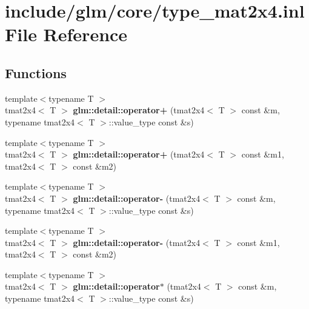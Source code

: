 \hypertarget{type__mat2x4_8inl}{\section{include/glm/core/type\-\_\-mat2x4.inl \-File \-Reference}
\label{type__mat2x4_8inl}
}
\subsection*{\-Functions}
\begin{DoxyCompactItemize}
\item 
\hypertarget{namespaceglm_1_1detail_a924aab5985fc7ae5cfe42a4b711872b9}{{\footnotesize template$<$typename T $>$ }\\tmat2x4$<$ \-T $>$ {\bfseries glm\-::detail\-::operator+} (tmat2x4$<$ \-T $>$ const \&m, typename tmat2x4$<$ \-T $>$\-::value\-\_\-type const \&s)}\label{namespaceglm_1_1detail_a924aab5985fc7ae5cfe42a4b711872b9}

\item 
\hypertarget{namespaceglm_1_1detail_a8a1cb4aca4d71974265b20a556f77f17}{{\footnotesize template$<$typename T $>$ }\\tmat2x4$<$ \-T $>$ {\bfseries glm\-::detail\-::operator+} (tmat2x4$<$ \-T $>$ const \&m1, tmat2x4$<$ \-T $>$ const \&m2)}\label{namespaceglm_1_1detail_a8a1cb4aca4d71974265b20a556f77f17}

\item 
\hypertarget{namespaceglm_1_1detail_a04309ed003f6db662629f172371fd070}{{\footnotesize template$<$typename T $>$ }\\tmat2x4$<$ \-T $>$ {\bfseries glm\-::detail\-::operator-\/} (tmat2x4$<$ \-T $>$ const \&m, typename tmat2x4$<$ \-T $>$\-::value\-\_\-type const \&s)}\label{namespaceglm_1_1detail_a04309ed003f6db662629f172371fd070}

\item 
\hypertarget{namespaceglm_1_1detail_a3421bd3205917c8daad5760334615e1e}{{\footnotesize template$<$typename T $>$ }\\tmat2x4$<$ \-T $>$ {\bfseries glm\-::detail\-::operator-\/} (tmat2x4$<$ \-T $>$ const \&m1, tmat2x4$<$ \-T $>$ const \&m2)}\label{namespaceglm_1_1detail_a3421bd3205917c8daad5760334615e1e}

\item 
\hypertarget{namespaceglm_1_1detail_a97c898dbdb3a0f9cd0089ffb42118e01}{{\footnotesize template$<$typename T $>$ }\\tmat2x4$<$ \-T $>$ {\bfseries glm\-::detail\-::operator$\ast$} (tmat2x4$<$ \-T $>$ const \&m, typename tmat2x4$<$ \-T $>$\-::value\-\_\-type const \&s)}\label{namespaceglm_1_1detail_a97c898dbdb3a0f9cd0089ffb42118e01}


\end{DoxyCompactItemize}
